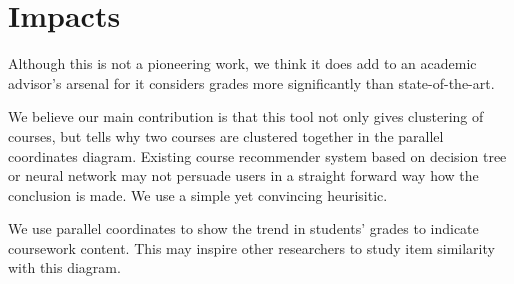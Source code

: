 \section{Impacts}
\label{sec:impact}

Although this is not a pioneering work, we think it does add to an academic advisor's arsenal for it considers grades more significantly than state-of-the-art.

We believe our main contribution is that this tool not only gives clustering of courses, but tells why two courses are clustered together in the parallel coordinates diagram. Existing course recommender system based on decision tree or neural network may not persuade users in a straight forward way how the conclusion is made. We use a simple yet convincing heurisitic.

We use parallel coordinates to show the trend in students' grades to indicate coursework content. This may inspire other researchers to study item similarity with this diagram.
